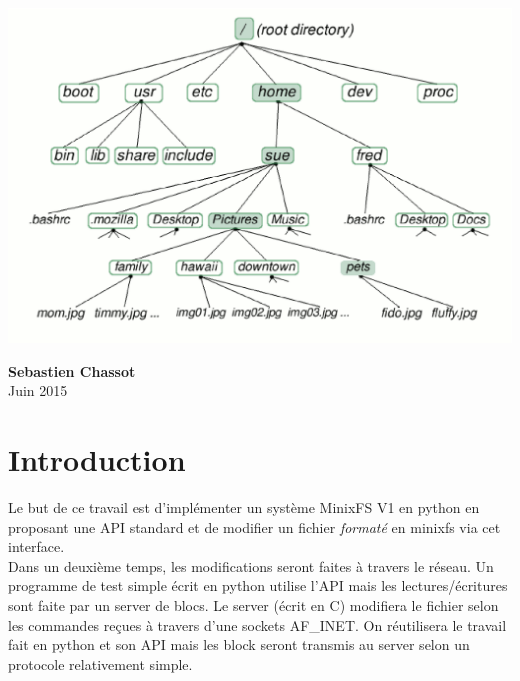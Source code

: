 \documentclass[a4paper,12pt]{article}
\begin{document}
\vspace{3cm}
\centerline{\includegraphics[scale=0.52]{imgs/illustration_FS}}
\vspace{2cm}

\begin{center}
\textbf{Sebastien Chassot} \\ Juin 2015
\end{center}

\thispagestyle{empty} %

\newpage %
\tableofcontents %
\listoffigures
\listoftables
\newpage %



\section{Introduction}

Le but de ce travail est d'implémenter un système MinixFS V1 en python en proposant une API standard et de modifier un fichier \emph{formaté} en minixfs via cet interface.\\

Dans un deuxième temps, les modifications seront faites à travers le réseau. Un programme de test simple écrit en python utilise l'API mais les lectures/écritures sont faite par un server de blocs. Le server (écrit en C) modifiera le fichier selon les commandes reçues à travers d'une sockets AF\_INET. On réutilisera le travail fait en python et son API mais les block seront transmis au server selon un protocole relativement simple.
 
\end{document}
